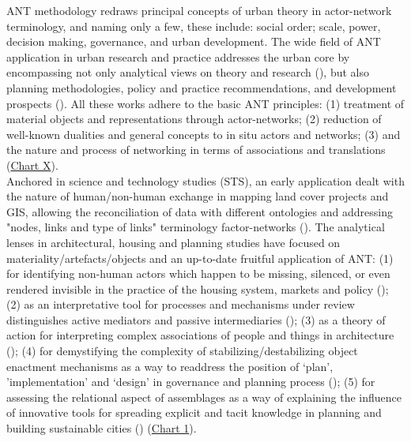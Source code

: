 \documentclass[11pt]{report}
\begin{document}
{{{{ANT methodology redraws principal concepts of urban theory in actor-network terminology, and naming only a few, these include: social order; scale, power, decision making, governance, and urban development. The wide field of ANT application in urban research and practice addresses the urban core by encompassing not only analytical views on theory and research  (\href{Boelens}{\citealt{boelens_theorizing_2010}}), but also planning methodologies, policy and practice recommendations, and development prospects (\href{Healey}{\citealt{healey_circuits_2013}}). All these works adhere to the basic ANT principles: (1) treatment of material objects and representations through actor-networks; (2) reduction of well-known dualities and general concepts to in situ actors and networks; (3) and the nature and process of networking in terms of associations and translations (\href{Table ANT table}{Chart X}).
\\

Anchored in science and technology studies (STS), an early application dealt with the nature of human/non-human exchange in mapping land cover projects and GIS, allowing the reconciliation of data with different ontologies and addressing "nodes, links and type of links" terminology factor-networks  (\href{Comber}{\citealt{comber_actornetwork_2003}}). The analytical lenses in architectural, housing and planning studies have focused on materiality/artefacts/objects and an up-to-date fruitful application of ANT: 
(1) for identifying non-human actors which happen to be missing, silenced, or even rendered invisible in the practice of the housing system, markets and policy (\href{Gabriel}{\citealt{gabriel_post-social_2008}}); (2) as an interpretative tool for processes and mechanisms under review distinguishes active mediators and passive intermediaries (\href{Cowan}{\citealt{cowan_nominations:_2009}}); (3) as a theory of action for interpreting complex associations of people and things in architecture (\href{Fallan}{\citealt{fallan_architecture_2011}}); (4) for demystifying the complexity of stabilizing/destabilizing object enactment mechanisms as a way to readdress the position of ‘plan’, ’implementation’ and ‘design’ in governance and planning process (\href{Van_Assche}{\citealt{van_assche_co-evolutions_2013}}); (5) for assessing the relational aspect of assemblages as a way of explaining the influence of innovative tools for spreading explicit and tacit knowledge in planning and building sustainable cities (\href{Georg}{\citealt{georg_building_2015}}) (\href{Table 1}{Chart 1}).
\\

}}}}
\end{document}
